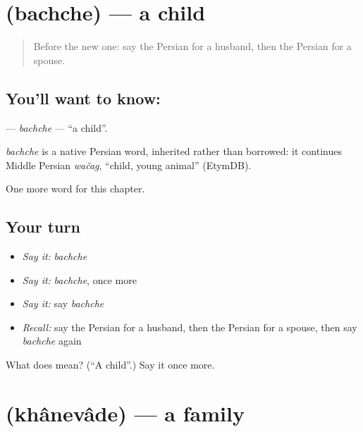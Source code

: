 \section[\texorpdfstring{\fa{بچه} (bachche)}{بچه (bachche)}]{ (bachche) — a child}

\label{lesson:FA-C33-bachche}



\begin{quote}
Before the new one: say the Persian for a husband, then the Persian for a spouse.
\end{quote}

\subsection*{You'll want to know: }
\textbf{} — \emph{bachche} — \textquotedblleft{}a child\textquotedblright{}.

\begin{cousinweb}
\emph{bachche} is a native Persian word, inherited rather than borrowed: it continues Middle Persian \emph{wačag}, \textquotedblleft{}child, young animal\textquotedblright{} (EtymDB).
\end{cousinweb}

\begin{grammarlens}[title={What you've built}]
One more word for this chapter.
\end{grammarlens}

\subsection*{Your turn}
\begin{itemize}
\raggedright
  \item \emph{Say it:} \emph{bachche}
  \item \emph{Say it:} \emph{bachche}, once more
  \item \emph{Say it:} say \emph{bachche}
  \item \emph{Recall:} say the Persian for a husband, then the Persian for a spouse, then say \emph{bachche} again
\end{itemize}

\begin{tcolorbox}[breakable,colback=teal!4,colframe=teal!35!black,title={Before you move on}]
What does  mean? (\textquotedblleft{}A child\textquotedblright{}.) Say it once more.
\end{tcolorbox}
\section[\texorpdfstring{\fa{خانواده} (khânevâde)}{خانواده (khânevâde)}]{ (khânevâde) — a family}

